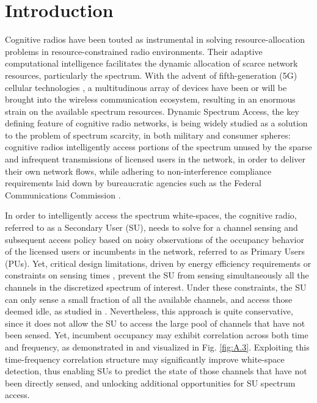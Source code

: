 \documentclass[12pt, draftcls, onecolumn]{IEEEtran}
\begin{document}
\section{Introduction}\label{O}
Cognitive radios have been touted as instrumental in solving resource-allocation problems in resource-constrained radio environments. Their adaptive computational intelligence facilitates the dynamic allocation of scarce network resources, particularly the spectrum. With the advent of fifth-generation (5G) cellular technologies \cite{Ericsson:5Gusecases, WSJ:5Gdominance}, a multitudinous array of devices have been or will be brought into the wireless communication ecosystem, resulting in an enormous strain on the available spectrum resources. Dynamic Spectrum Access, the key defining feature of cognitive radio networks, is being widely studied as a solution to the problem of spectrum scarcity, in both military and consumer spheres: cognitive radios intelligently access portions of the spectrum unused by the sparse and infrequent transmissions of licensed users in the network, in order to deliver their own network flows, while adhering to non-interference compliance requirements laid down by bureaucratic agencies such as the Federal Communications Commission \cite{WSJ:CBRS, WSJ:HolmanJenkinsJr.}.

In order to intelligently access the spectrum white-spaces, the
cognitive radio, referred to as a Secondary User (SU), needs to solve for a channel sensing and subsequent access policy based on noisy observations of the occupancy behavior of the licensed users or incumbents in the network, referred to as Primary Users (PUs). Yet, critical design limitations, driven by energy efficiency requirements or constraints on sensing times \cite{WCL:3}, prevent the SU from sensing simultaneously all the channels in the discretized spectrum of interest. Under these constraints, the SU can only sense a small fraction of all the available channels, and access those deemed idle, as studied in \cite{WCL:3, WCL:4, WCL:5, WCL:6, WCL:8, WCL:9, WCL:10, WCL:11}. Nevertheless, this approach is quite conservative, since it does not allow the SU to access the large pool of channels that have not been sensed. Yet, incumbent occupancy may exhibit  correlation across both time and frequency, as demonstrated in \cite{WCL:12} and visualized in Fig. \ref{fig:A.3}. Exploiting this time-frequency correlation structure may significantly improve white-space detection, thus enabling SUs to predict the state of those channels that have not been directly sensed, and unlocking additional opportunities for SU spectrum access.
\end{document}
